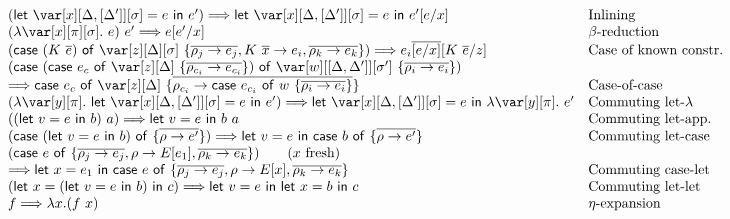 \documentclass[acmsmall,review,screen]{acmart}
\newcommand{\llet}[2]{\mathsf{let}~#1~\mathsf{in}~#2}
\newcommand{\ccase}[2]{\mathsf{case}~#1~\mathsf{of}~#2}
\begin{document}
\begin{figure}[t]

  {\small
  \[
    \begin{array}{ll}
   (\llet{\xD = e}{e'} )  \Longrightarrow \llet{\xD =       e}{e'[e/x]} &                    \mbox{Inlining}\\
       (\lambda \x[\pi][\s].~e)~e'  \Longrightarrow e[e'/x]  &                \mbox{$\beta$-reduction}\\
      (\ccase{(K~\ov{e})}{\z[\D][\s]~\{\overline{\rho_j\to e_j}, K~\ov{x} \to e_i, \overline{\rho_k\to e_k}\}} )\Longrightarrow  e_i\ov{[e/x]}[K~\ov{e}/z] &
                                  \mbox{Case of known constr.}\\
      (\ccase{(\ccase{e_c}{\z[\D]~\{\ov{\rho_{c_i}\to e_{c_i}}\}})}{\var[w][\irr{\D,\D'}][\s']~\{\ov{\rho_i\to e_i}\}})\\
            \Longrightarrow 
      \ccase{e_c}{\z[\D]~\{\ov{\rho_{c_i} \to \ccase{e_{c_i}}{w~\{\ov{\rho_i\to e_i}\}}}\}}
      & \mbox{Case-of-case}\\
      (\lambda \y[\pi].~\llet{\xD = e}{e'})
      \Longrightarrow
      \llet{\xD=e}{\lambda\y[\pi].~e'} & \mbox{Commuting let-$\lambda$}\\
      ((\llet{v = e}{b})~a) \Longrightarrow \llet{v = e}{b~a} &\mbox{Commuting let-app.}\\
      (\ccase{(\llet{v = e}{b})}{\{\overline{\rho\to e'}\}}) \Longrightarrow
      \llet{v =  e}{\ccase{b}{\{\overline{\rho\to e'}\}}}
                               &
                                 \mbox{Commuting let-case}\\
      (\ccase{e}{\{\overline{\rho_j\to e_j}, \rho \to E[e_1],
      \overline{\rho_k\to e_k}\}} ) \qquad (\mbox{$x$ fresh}) \\
     \Longrightarrow \llet{x = e_1}{\ccase{e}{\{\overline{\rho_j\to e_j}, \rho \to E[x], \overline{\rho_k\to e_k}\}}} 
                                                                        & \mbox{Commuting case-let}\\
      (\llet{x = (\llet{v = e}{b})}{c}) \Longrightarrow \llet{v = e}{\llet{x = b}{c}}
                                                                      & \mbox{Commuting let-let}\\
      f \Longrightarrow \lambda x.(f~x) & \mbox{$\eta$-expansion}\\

\end{array}\]}
\end{figure}
\end{document}
